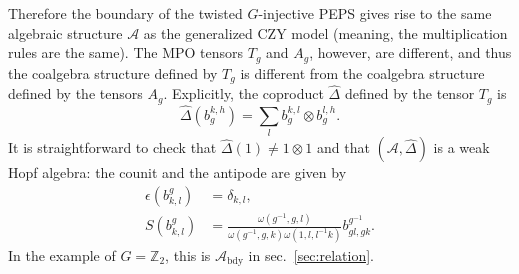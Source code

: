 \documentclass[prx, twocolumn, superscriptaddress, dvipsnames]{revtex4-2}
\theoremstyle{definition}
\newcommand{\mA}{\mathcal{A}}
\newcommand{\bdy}{\text{bdy}}
\begin{document}
Therefore the boundary of the twisted $G$-injective PEPS gives rise to the same algebraic structure $\mA$ as the generalized CZY model (meaning, the multiplication rules are the same). The MPO tensors $T_g$ and $A_g$, however, are different, and thus the coalgebra structure defined by $T_g$ is different from the coalgebra structure defined by the tensors $A_g$.  Explicitly, the coproduct $\hat{\Delta}$ defined by the tensor $T_g$ is 
\begin{equation*}
    \hat{\Delta}(b_g^{k,h}) = \sum_{l} b_g^{k,l} \otimes b_g^{l,h}.
\end{equation*}
It is straightforward to check that $\hat{\Delta}(1)\neq 1\otimes 1$ and that $(\mathcal{A},\hat{\Delta})$ is a weak Hopf algebra: the counit and the antipode are given by
\begin{align}
      \epsilon(b^g_{k,l}) &= \delta_{k,l}, \\
      S(b^g_{k,l}) &= \frac{\omega(g^{-1},g,l)}{\omega(g^{-1},g,k)\omega(1,l,l^{-1}k)}b^{g^{-1}}_{gl,gk}.    
\end{align}
In the example of $G=\mathbb{Z}_2$, this is $\mA_\bdy$ in sec.~\ref{sec:relation}. 




\end{document}
